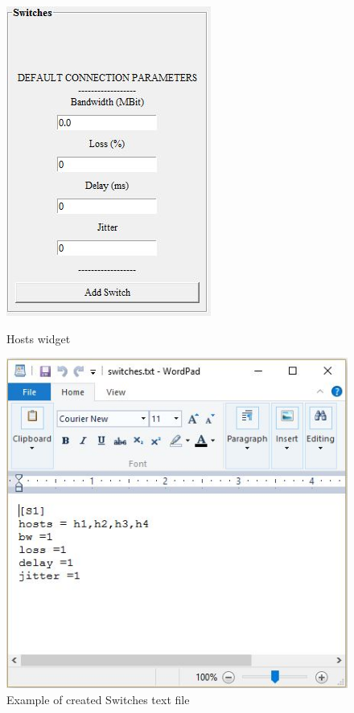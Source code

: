 \begin{figure}[H]
\centering
\begin{minipage}{.5\textwidth}
  \centering
  \includegraphics[width=.4\linewidth]{Switches}
  \caption{Hosts widget}
  \label{fig:test1}
\end{minipage}%
\begin{minipage}{.5\textwidth}
  \centering
  \includegraphics[width=.8\linewidth]{switches_txt}
  \caption{Example of created Switches text file}
  \label{fig:test2}
\end{minipage}
\end{figure}

